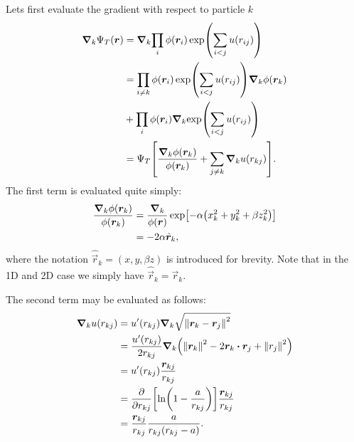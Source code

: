\documentclass[a4paper, 11pt]{article}
\begin{document}
\begin{multicols}{2}
Lets first evaluate the gradient with respect to particle $k$
\begin{align}
    \begin{split}
    \grad_k{\Psi_T(\bm r)}  
    &= \grad_k{\prod_i \phi(\bm r_i)\exp(\sum_{i<j}u(r_{ij}))}\\
    &= \prod_{i\neq k} \phi(\bm r_i)\exp(\sum_{i<j}u(r_{ij}))\grad_k{\phi(\bm
    r_k)}\\
    &+ \prod_{i} \phi(\bm r_i)\grad_k{\exp(\sum_{i<j}u(r_{ij}))}\\
    &= \Psi_T\qty[\frac{\grad_k \phi(\bm r_k)}{\phi(\bm r_k)} + \sum_{j\neq k}
    \grad_k u(r_{kj})].
    \end{split}\label{eq:grad-trail-wf}
\end{align}
The first term is evaluated quite simply:
\begin{align}
    \begin{split}
    \frac{\grad_k\phi(\bm r_k)}{\phi(\bm r_k)} &= \frac{\grad_k}{\phi(\bm r)}
    \exp[-\alpha\qty(x_k^2 + y_k^2 + \beta z_k^2)]\\
        &= -2\alpha\hat{\bm r}_k,
    \end{split}\label{eq:grad-phi_k-over-phi_k}
\end{align}
where the notation $\hat{\vec r}_k = (x, y,\beta z)$ is introduced for brevity.
Note that in the 1D and 2D case we simply have $\hat{\vec r}_k = \vec r_k$.


The second term may be evaluated as follows:
\begin{align}
    \begin{split}
    \grad_k u(r_{kj}) &= u'(r_{kj})\grad_k \sqrt{\norm{\vec r_k - \vec r_j}^2} \\
    &= \frac{u'(r_{kj})}{2r_{kj}}\grad_k\qty(\norm{\vec r_k}^2-2\vec r_k\vdot\vec
    r_j+\norm{r_j}^2)\\
    &= u'(r_{kj})\frac{\vec r_{kj}}{r_{kj}}\\
    &= \pdv{}{r_{kj}}\qty[ \ln(1 - \frac{a}{r_{kj}})] \frac{\vec
    r_{kj}}{r_{kj}}\\
    &= \frac{\vec r_{kj}}{r_{kj}}\frac{a}{r_{kj}(r_{kj}-a)}.
    \end{split}\label{eq:grad-u}
\end{align}


\end{multicols}
\end{document}
